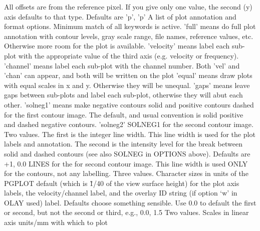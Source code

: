 {All offsets are from the reference pixel.  If you give only one 
value, the second (y) axis defaults to that type.
Defaults are 'p', 'p'
A list of plot annotation and format options. Minimum match 
of all keywords is active.
\newline\newline 'full' means do full plot annotation with contour levels, gray
  scale range, file names, reference values, etc.  Otherwise 
  more room for the plot is available. 
\newline\newline 'velocity' means label each sub-plot with the appropriate value 
  of the third axis (e.g. velocity or frequency).   
\newline\newline 'channel' means label each sub-plot with the channel number. 
  Both 'vel' and 'chan' can appear, and both will be written 
  on the plot
\newline\newline 'equal' means draw plots with equal scales in x and y. 
  Otherwise they will be unequal.
\newline\newline 'gaps' means leave gaps between sub-plots and label each 
  sub-plot, otherwise they will abut each other.
\newline\newline 'solneg1' means make negative contours solid and positive 
  contours dashed for the first contour image. The default, 
  and usual convention is solid positive and dashed 
  negative contours. 
\newline\newline 'solneg2' SOLNEG1 for the second contour image.
Two values.  The first is the integer line width.  This line
width is used for the plot labels and annotation.
The second is the intensity level for the break between solid 
and dashed contours (see also SOLNEG in OPTIONS above). 
Defaults are +1, 0.0
LINES for the for second contour image.  This line width
is used ONLY for the contours, not any labelling.
Three values.  Character sizes in units of the PGPLOT default
(which is \~ 1/40 of the view surface height) for the plot axis
labels, the velocity/channel label, and the overlay ID string
(if option `w' in OLAY used) label.
Defaults choose something sensible.  Use 0.0 to default the 
first or second, but not the second or third, e.g., 0.0, 1.5
Two values.  Scales in linear axis units/mm with which to plot
}
